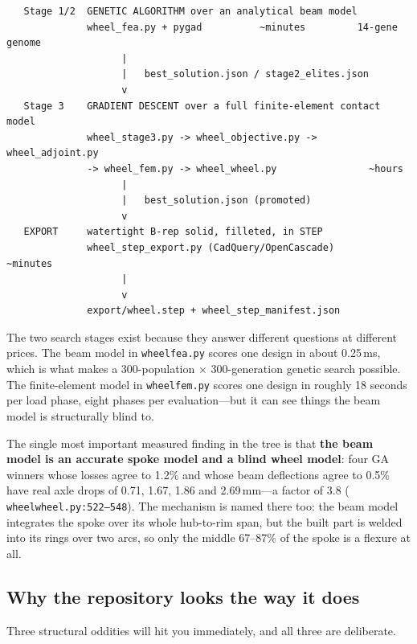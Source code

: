 \documentclass[11pt,a4paper]{article}
\DeclareRobustCommand{\code}[1]{%
  \texttt{\small\def\_{\textunderscore\discretionary{}{}{}}#1}}
\newcommand{\at}[2]{\code{#1:#2}}
\begin{document}
\begin{lstlisting}
   Stage 1/2  GENETIC ALGORITHM over an analytical beam model
              wheel_fea.py + pygad          ~minutes         14-gene genome
                    |
                    |   best_solution.json / stage2_elites.json
                    v
   Stage 3    GRADIENT DESCENT over a full finite-element contact model
              wheel_stage3.py -> wheel_objective.py -> wheel_adjoint.py
              -> wheel_fem.py -> wheel_wheel.py                ~hours
                    |
                    |   best_solution.json (promoted)
                    v
   EXPORT     watertight B-rep solid, filleted, in STEP
              wheel_step_export.py (CadQuery/OpenCascade)      ~minutes
                    |
                    v
              export/wheel.step + wheel_step_manifest.json
\end{lstlisting}

The two search stages exist because they answer different questions at different
prices. The beam model in \code{wheel\_fea.py} scores one design in about 0.25\,ms,
which is what makes a 300-population $\times$ 300-generation genetic search possible.
The finite-element model in \code{wheel\_fem.py} scores one design in roughly 18
seconds per load phase, eight phases per evaluation---but it can see things the beam
model is structurally blind to.

The single most important measured finding in the tree is that \textbf{the beam model
is an accurate spoke model and a blind wheel model}: four GA winners whose losses agree
to 1.2\% and whose beam deflections agree to 0.5\% have real axle drops of 0.71, 1.67,
1.86 and 2.69\,mm---a factor of 3.8 (\at{wheel\_wheel.py}{522--548}). The mechanism is
named there too: the beam model integrates the spoke over its whole hub-to-rim span,
but the built part is welded into its rings over two arcs, so only the middle 67--87\%
of the spoke is a flexure at all.

\subsection{Why the repository looks the way it does}

Three structural oddities will hit you immediately, and all three are deliberate.
\end{document}
